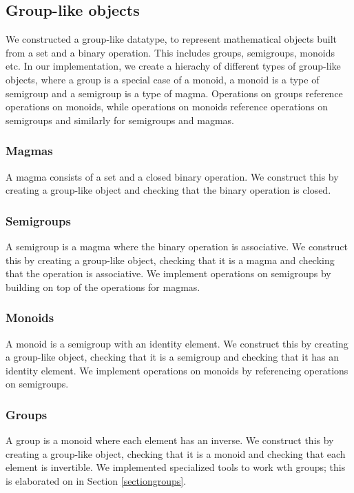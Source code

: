 \documentclass{article}
\begin{document}
            

        
        
        \subsection{Group-like objects}
            We constructed a group-like datatype, to represent mathematical objects built from a set and a binary operation. This includes groups, semigroups, monoids etc. In our implementation, we create a hierachy of different types of group-like objects, where a group is a special case of a monoid, a monoid is a type of semigroup and a semigroup is a type of magma. Operations on groups reference operations on monoids, while operations on monoids reference operations on semigroups and similarly for semigroups and magmas. 


		\subsubsection{Magmas}
			A magma consists of a set and a closed binary operation. We construct this by creating a group-like object and checking that the binary operation is closed.

		\subsubsection{Semigroups}
			A semigroup is a magma where the binary operation is associative. We construct this by creating a group-like object, checking that it is a magma and checking that the operation is associative. We implement operations on semigroups by building on top of the operations for magmas.

		\subsubsection{Monoids}
			A monoid is a semigroup with an identity element. We construct this by creating a group-like object, checking that it is a semigroup and checking that it has an identity element. We implement operations on monoids by referencing operations on semigroups.

		\subsubsection{Groups}
			A group is a monoid where each element has an inverse. We construct this by creating a group-like object, checking that it is a monoid and checking that each element is invertible. We implemented specialized tools to work wth groups; this is elaborated on in Section \ref{sectiongroups}.
        
\end{document}
